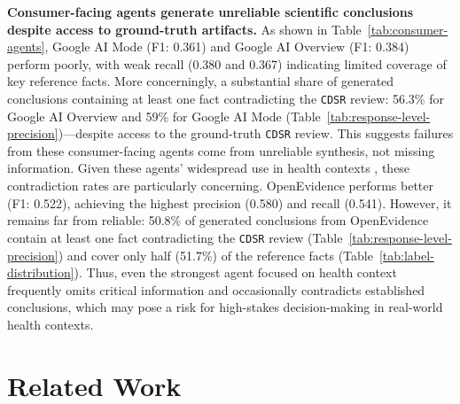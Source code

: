 \documentclass{article}
\begin{document}
\textbf{Consumer-facing agents generate unreliable scientific conclusions despite access to ground-truth artifacts.} As shown in Table~\ref{tab:consumer-agents}, Google AI Mode (F1: 0.361) and Google AI Overview (F1: 0.384) perform poorly, with weak recall (0.380 and 0.367) indicating limited coverage of key reference facts. More concerningly, a substantial share of generated conclusions containing at least one fact contradicting the \texttt{CDSR} review: 56.3\% for Google AI Overview and 59\% for Google AI Mode (Table~\ref{tab:response-level-precision})---despite access to the ground-truth \texttt{CDSR} review. This suggests failures from these consumer-facing agents come from unreliable synthesis, not missing information. Given these agents' widespread use in health contexts \cite{nytimes_google_ai_health_2024}, these contradiction rates are particularly concerning. OpenEvidence performs better (F1: 0.522), achieving the highest precision (0.580) and recall (0.541). However, it remains far from reliable: 50.8\% of generated conclusions from OpenEvidence contain at least one fact contradicting the \texttt{CDSR} review (Table~\ref{tab:response-level-precision}) and cover only half (51.7\%) of the reference facts (Table~\ref{tab:label-distribution}). Thus, even the strongest agent focused on health context frequently omits critical information and occasionally contradicts established conclusions, which may pose a risk for high-stakes decision-making in real-world health contexts.







\section{Related Work}
\end{document}
